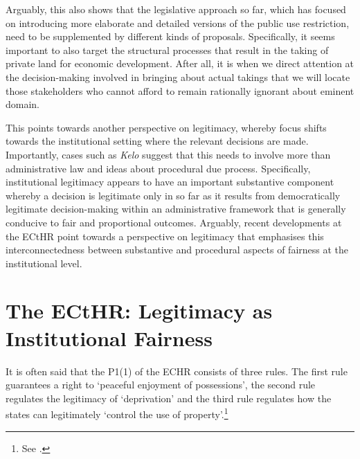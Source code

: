 Arguably, this also shows that the legislative approach so far, which has focused on introducing more elaborate and detailed versions of the public use restriction, need to be supplemented by different kinds of proposals. Specifically, it seems important to also target the structural processes that result in the taking of private land for economic development. After all, it is when we direct attention at the decision-making involved in bringing about actual takings that we will locate those stakeholders who cannot afford to remain rationally ignorant about eminent domain. %

This points towards another perspective on legitimacy, whereby focus shifts towards the institutional setting where the relevant decisions are made. Importantly, cases such as {\it Kelo} suggest that this needs to involve more than administrative law and ideas about procedural due process. Specifically, institutional legitimacy appears to have an important substantive component whereby a decision is legitimate only in so far as it results from democratically legitimate decision-making within an administrative framework that is generally conducive to fair and proportional outcomes. Arguably, recent developments at the ECtHR point towards a perspective on legitimacy that emphasises this interconnectedness between substantive and procedural aspects of fairness at the institutional level.

\section{The ECtHR: Legitimacy as Institutional Fairness}\label{sec:3:4}

It is often said that the P1(1) of the ECHR consists of three rules. The first rule guarantees a right to `peaceful enjoyment of possessions', the second rule regulates the legitimacy of `deprivation' and the third rule regulates how the states can legitimately `control the use of property'.\footnote{See \cite[61]{sporrong82}.}

